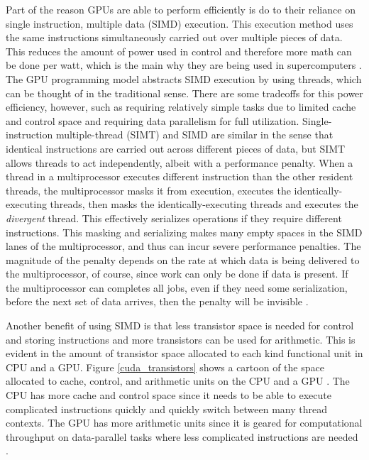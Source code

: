 Part of the reason GPUs are able to perform efficiently is do to their reliance on single instruction, multiple data (SIMD) execution.  This execution method uses the same instructions simultaneously carried out over multiple pieces of data.  This reduces the amount of power used in control and therefore more math can be done per watt, which is the main why they are being used in supercomputers \cite{exascale}.  The GPU programming model abstracts SIMD execution by using threads, which can be thought of in the traditional sense. There are some tradeoffs for this power efficiency, however, such as requiring relatively simple tasks due to limited cache and control space and requiring data parallelism for full utilization.  Single-instruction multiple-thread (SIMT) and SIMD are similar in the sense that identical instructions are carried out across different pieces of data, but SIMT allows threads to act independently, albeit with a performance penalty.   When a thread in a multiprocessor executes different instruction than the other resident threads, the multiprocessor masks it from execution, executes the identically-executing threads, then masks the identically-executing threads and executes the \emph{divergent} thread.  This effectively serializes operations if they require different instructions.  This masking and serializing makes many empty spaces in the SIMD lanes of the multiprocessor, and thus can incur severe performance penalties.  The magnitude of the penalty depends on the rate at which data is being delivered to the multiprocessor, of course, since work can only be done if data is present.  If the multiprocessor can completes all jobs, even if they need some serialization, before the next set of data arrives, then the penalty will be invisible \cite{cuda}.

Another benefit of using SIMD is that less transistor space is needed for control and storing instructions and more transistors can be used for arithmetic.  This is evident in the amount of transistor space allocated to each kind functional unit in CPU and a GPU.  Figure \ref{cuda_transistors} shows a cartoon of the space allocated to cache, control, and arithmetic units on the CPU and a GPU \cite{cuda}.  The CPU has more cache and control space since it needs to be able to execute complicated instructions quickly and quickly switch between many thread contexts.  The GPU has more arithmetic units since it is geared for computational throughput on data-parallel tasks where less complicated instructions are needed \cite{cuda}.

